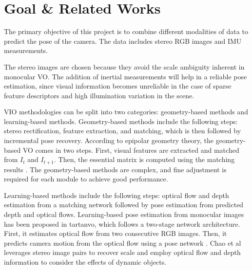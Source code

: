 \documentclass[10pt,letterpaper]{article}
\begin{document}


 
\section*{Goal \& Related Works}
The primary objective of this project is to combine different modalities of data to predict the pose of the camera. The data includes stereo RGB images and IMU measurements. 

The stereo images are chosen because they avoid the scale ambiguity inherent in monocular VO. The addition of inertial measurements will help in a reliable pose estimation, since visual information becomes unreliable in the case of sparse feature descriptors and high illumination variation in the scene. 

VIO methodologies can be split into two categories: geometry-based methods and learning-based methods. Geometry-based methods include the following steps: stereo rectification, feature extraction, and matching, which is then followed by incremental pose recovery. According to epipolar geometry theory, the geometry-based VO comes in two steps. First, visual features are extracted and matched from $I_t$ and $I_{t+1}$. Then, the essential matrix is computed using the matching results \cite{beall2014stereo}. The geometry-based methods are complex, and fine adjustment is required for each module to achieve good performance. 

Learning-based methods include the following steps: optical flow and depth estimation from a matching network followed by pose estimation from predicted depth and optical flows. Learning-based pose estimation from monocular images has been proposed in tartanvo\cite{tartanvo2020corl}, which follows a two-stage network architecture. First, it estimates optical flow from two consecutive RGB images. Then, it predicts camera motion from the optical flow using a pose network .
Chao et al \cite{duan2023stereovo} leverages stereo image pairs to recover scale and employ optical flow and depth information to consider the effects of dynamic objects.
\end{document}
